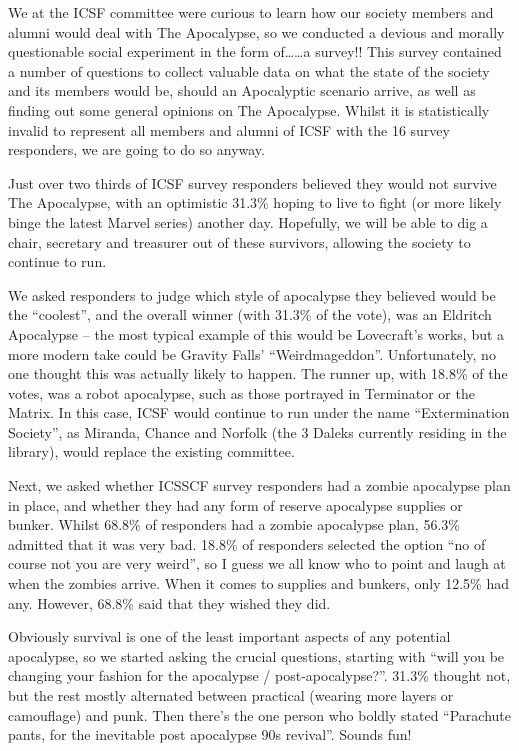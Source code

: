We at the ICSF committee were curious to learn how our society members and alumni would deal with The Apocalypse, so we conducted a devious and morally questionable social experiment in the form of……a survey!! This survey contained a number of questions to collect valuable data on what the state of the society and its members would be, should an Apocalyptic scenario arrive, as well as finding out some general opinions on The Apocalypse. Whilst it is statistically invalid to represent all members and alumni of ICSF with the 16 survey responders, we are going to do so anyway. 

Just over two thirds of ICSF survey responders believed they would not survive The Apocalypse, with an optimistic 31.3\% hoping to live to fight (or more likely binge the latest Marvel series) another day. Hopefully, we will be able to dig a chair, secretary and treasurer out of these survivors, allowing the society to continue to run. 

We asked responders to judge which style of apocalypse they believed would be the “coolest”, and the overall winner (with 31.3\% of the vote), was an Eldritch Apocalypse – the most typical example of this would be Lovecraft’s works, but a more modern take could be Gravity Falls’ “Weirdmageddon”. Unfortunately, no one thought this was actually likely to happen. The runner up, with 18.8\% of the votes, was a robot apocalypse, such as those portrayed in Terminator or the Matrix. In this case, ICSF would continue to run under the name “Extermination Society”, as Miranda, Chance and Norfolk (the 3 Daleks currently residing in the library), would replace the existing committee. 

Next, we asked whether ICSSCF survey responders had a zombie apocalypse plan in place, and whether they had any form of reserve apocalypse supplies or bunker. Whilst 68.8\% of responders had a zombie apocalypse plan, 56.3\% admitted that it was very bad. 18.8\% of responders selected the option “no of course not you are very weird”, so I guess we all know who to point and laugh at when the zombies arrive. When it comes to supplies and bunkers, only 12.5\% had any. However, 68.8\% said that they wished they did. 

Obviously survival is one of the least important aspects of any potential apocalypse, so we started asking the crucial questions, starting with “will you be changing your fashion for the apocalypse / post-apocalypse?”. 31.3\% thought not, but the rest mostly alternated between practical (wearing more layers or camouflage) and punk. Then there’s the one person who boldly stated “Parachute pants, for the inevitable post apocalypse 90s revival”. Sounds fun!

